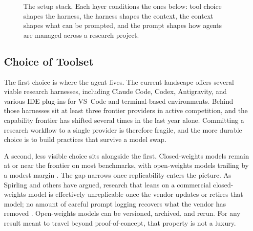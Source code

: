 \documentclass[11pt]{article}
\begin{document}
\begin{figure}[t]
  \centering
  \caption{The setup stack. Each layer conditions the ones below: tool choice shapes the harness, the harness shapes the context, the context shapes what can be prompted, and the prompt shapes how agents are managed across a research project.}
  \label{fig:setup-flow}
\end{figure}

\subsection{Choice of Toolset}
\label{sec:deploy-toolset}

The first choice is where the agent lives. The current landscape offers several viable research harnesses, including Claude Code, Codex, Antigravity, and various IDE plug-ins for VS~Code and terminal-based environments. Behind those harnesses sit at least three frontier providers in active competition, and the capability frontier has shifted several times in the last year alone. Committing a research workflow to a single provider is therefore fragile, and the more durable choice is to build practices that survive a model swap.

A second, less visible choice sits alongside the first. Closed-weights models remain at or near the frontier on most benchmarks, with open-weights models trailing by a modest margin \citep{hai2026aiindex}. The gap narrows once replicability enters the picture. As Spirling and others have argued, research that leans on a commercial closed-weights model is effectively unreplicable once the vendor updates or retires that model; no amount of careful prompt logging recovers what the vendor has removed \citep{spirling2023opensource, spirling2026talks}. Open-weights models can be versioned, archived, and rerun. For any result meant to travel beyond proof-of-concept, that property is not a luxury.
\end{document}
